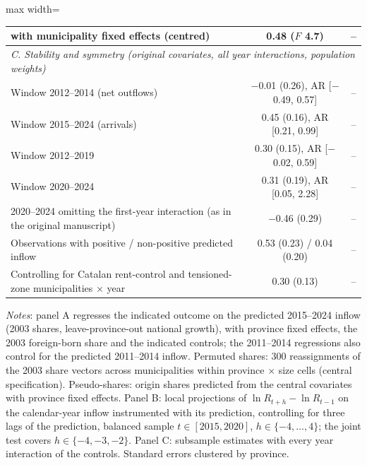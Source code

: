 \begin{table}[!htbp]
\begin{adjustbox}{max width=\linewidth}
\begin{tabular}{lcc}
\quad with municipality fixed effects (centred) & 0.48 ($F$ 4.7) & --\\
\midrule\multicolumn{3}{l}{\textit{C. Stability and symmetry (original covariates, all year interactions, population weights)}}\\
Window 2012--2014 (net outflows) & $-$0.01 (0.26), AR [$-$0.49, 0.57] & --\\
Window 2015--2024 (arrivals) & 0.45 (0.16), AR [0.21, 0.99] & --\\
Window 2012--2019 & 0.30 (0.15), AR [$-$0.02, 0.59] & --\\
Window 2020--2024 & 0.31 (0.19), AR [0.05, 2.28] & --\\
2020--2024 omitting the first-year interaction (as in the original manuscript) & $-$0.46 (0.29) & --\\
Observations with positive / non-positive predicted inflow & 0.53 (0.23) / 0.04 (0.20) & --\\
Controlling for Catalan rent-control and tensioned-zone municipalities $\times$ year & 0.30 (0.13) & --\\
\bottomrule\end{tabular}\end{adjustbox}
\begin{minipage}{0.97\linewidth}\footnotesize\vspace{4pt}
\textit{Notes}: panel A regresses the indicated outcome on the predicted 2015--2024 inflow (2003 shares, leave-province-out national growth), with province fixed effects, the 2003 foreign-born share and the indicated controls; the 2011--2014 regressions also control for the predicted 2011--2014 inflow. Permuted shares: 300 reassignments of the 2003 share vectors across municipalities within province $\times$ size cells (central specification). Pseudo-shares: origin shares predicted from the central covariates with province fixed effects. Panel B: local projections of $\ln R_{t+h}-\ln R_{t-1}$ on the calendar-year inflow instrumented with its prediction, controlling for three lags of the prediction, balanced sample $t\in[2015,2020]$, $h\in\{-4,\dots,4\}$; the joint test covers $h\in\{-4,-3,-2\}$. Panel C: subsample estimates with every year interaction of the controls. Standard errors clustered by province.
\end{minipage}\end{table}